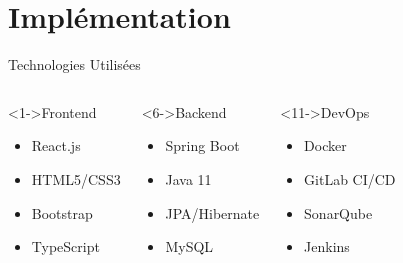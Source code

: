 \documentclass[aspectratio=169]{beamer}
\begin{document}
\section{Implémentation}

\begin{frame}{Technologies Utilisées}
    \begin{columns}[T]
        \begin{block}<1->{Frontend}
            \begin{itemize}
                \item<2-> \textcolor{capgeminiblue}{React.js}
                \item<3-> HTML5/CSS3
                \item<4-> Bootstrap
                \item<5-> TypeScript
            \end{itemize}
        \end{block}

        \begin{block}<6->{Backend}
            \begin{itemize}
                \item<7-> \textcolor{greencap}{Spring Boot}
                \item<8-> Java 11
                \item<9-> JPA/Hibernate
                \item<10-> MySQL
            \end{itemize}
        \end{block}

        \begin{block}<11->{DevOps}
            \begin{itemize}
                \item<12-> \textcolor{orangecap}{Docker}
                \item<13-> GitLab CI/CD
                \item<14-> SonarQube
                \item<15-> Jenkins
            \end{itemize}
        \end{block}
    \end{columns}

\end{frame}
\end{document}
